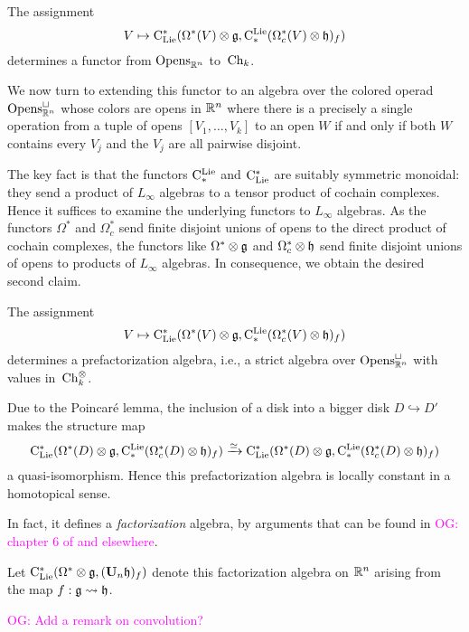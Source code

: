 \documentclass[11pt]{amsart}
\numberwithin{equation}{section}
\def\owen{\textcolor{magenta}{OG: }\textcolor{magenta}}
\begin{document}
\begin{lmm}
The assignment
\[
V \mapsto {\rm C}_{\rm Lie}^*(\Omega^*(V) \otimes \mathfrak g, {\rm C}^{\rm Lie}_*(\Omega^*_c(V) \otimes \mathfrak h)_f)
\]
determines a functor from ${\rm Opens}_{\mathbb R^n}$ to~${\rm Ch}_k$.
\end{lmm}

We now turn to extending this functor to an algebra over the colored operad ${\rm Opens}_{\mathbb R^n}^\sqcup$ whose colors are opens in $\mathbb R^n$ where there is a precisely a single operation from a tuple of opens $[V_1,\ldots,V_k]$ to an open $W$ if and only if both $W$ contains every $V_j$ and the $V_j$ are all pairwise disjoint.

The key fact is that the functors ${\rm C}^{\rm Lie}_*$ and ${\rm C}_{\rm Lie}^*$ are suitably symmetric monoidal:
they send a product of $L_\infty$ algebras to a tensor product of cochain complexes.
Hence it suffices to examine the underlying functors to $L_\infty$ algebras.
As the functors $\Omega^*$ and $\Omega^*_c$ send finite disjoint unions of opens to the direct product of cochain complexes, 
the functors like $\Omega^* \otimes \mathfrak g$ and $\Omega^*_c \otimes \mathfrak h$ send finite disjoint unions of opens to products of $L_\infty$ algebras.
In consequence, we obtain the desired second claim.

\begin{lmm}
The assignment
\[
V \mapsto {\rm C}_{\rm Lie}^*(\Omega^*(V) \otimes \mathfrak g, {\rm C}^{\rm Lie}_*(\Omega^*_c(V) \otimes \mathfrak h)_f)
\]
determines a prefactorization algebra, i.e., a strict algebra over ${\rm Opens}_{\mathbb R^n}^\sqcup$ with values in~${\rm Ch}_k^\otimes$.
\end{lmm}

Due to the Poincar\'e lemma, the inclusion of a disk into a bigger disk $D \hookrightarrow D'$ makes the structure map 
\[
{\rm C}_{\rm Lie}^*(\Omega^*(D) \otimes \mathfrak g, {\rm C}^{\rm Lie}_*(\Omega^*_c(D) \otimes \mathfrak h)_f) \xrightarrow{\simeq} {\rm C}_{\rm Lie}^*(\Omega^*(D) \otimes \mathfrak g, {\rm C}^{\rm Lie}_*(\Omega^*_c(D) \otimes \mathfrak h)_f)
\]
a quasi-isomorphism.
Hence this prefactorization algebra is locally constant in a homotopical sense.

In fact, it defines a {\em factorization} algebra, by arguments that can be found in \owen{chapter 6 of \cite{CG1} and elsewhere}.

\begin{dfn}
\label{dfn: centralizer for f}
Let ${\rm C}_{\rm Lie}^*(\Omega^* \otimes \mathfrak g, (\mathbf U_n \mathfrak h)_f)$ denote this factorization algebra on $\mathbb R^n$ arising from the map $f: \mathfrak g \rightsquigarrow \mathfrak h$.
\end{dfn}

\owen{Add a remark on convolution?}
%
%
%
%
\end{document}
